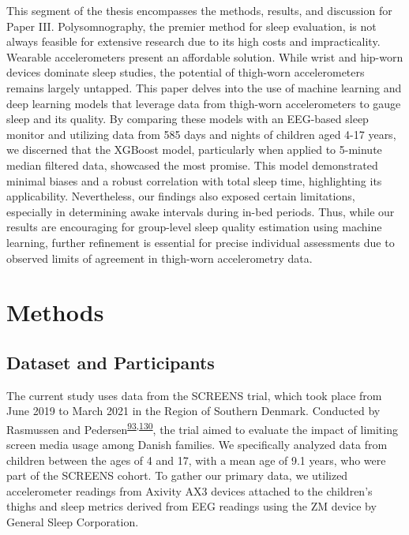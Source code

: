 \documentclass[
  9pt,
]{scrbook}
\begin{document}
This segment of the thesis encompasses the methods, results, and
discussion for Paper III. Polysomnography, the premier method for sleep
evaluation, is not always feasible for extensive research due to its
high costs and impracticality. Wearable accelerometers present an
affordable solution. While wrist and hip-worn devices dominate sleep
studies, the potential of thigh-worn accelerometers remains largely
untapped. This paper delves into the use of machine learning and deep
learning models that leverage data from thigh-worn accelerometers to
gauge sleep and its quality. By comparing these models with an EEG-based
sleep monitor and utilizing data from 585 days and nights of children
aged 4-17 years, we discerned that the XGBoost model, particularly when
applied to 5-minute median filtered data, showcased the most promise.
This model demonstrated minimal biases and a robust correlation with
total sleep time, highlighting its applicability. Nevertheless, our
findings also exposed certain limitations, especially in determining
awake intervals during in-bed periods. Thus, while our results are
encouraging for group-level sleep quality estimation using machine
learning, further refinement is essential for precise individual
assessments due to observed limits of agreement in thigh-worn
accelerometry data.

\hypertarget{methods-2}{%
\section{Methods}\label{methods-2}}

\hypertarget{dataset-and-participants}{%
\subsection{Dataset and Participants}\label{dataset-and-participants}}

The current study uses data from the SCREENS trial, which took place
from June 2019 to March 2021 in the Region of Southern Denmark.
Conducted by Rasmussen and
Pedersen\textsuperscript{\protect\hyperlink{ref-rasmussen_short-term_2020}{93},\protect\hyperlink{ref-pedersen_effects_2022}{130}},
the trial aimed to evaluate the impact of limiting screen media usage
among Danish families. We specifically analyzed data from children
between the ages of 4 and 17, with a mean age of 9.1 years, who were
part of the SCREENS cohort. To gather our primary data, we utilized
accelerometer readings from Axivity AX3 devices attached to the
children's thighs and sleep metrics derived from EEG readings using the
ZM device by General Sleep Corporation.
\end{document}
